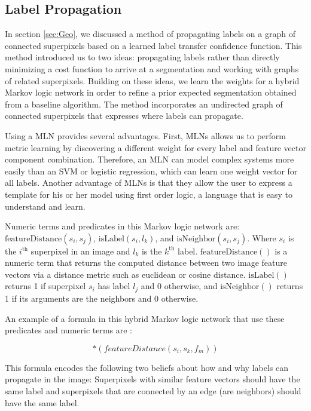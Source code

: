 \documentclass{article} %
\begin{document}
\subsection{Label Propagation}
\label{sec:AttemptLabProp}

	In section \ref{sec:Geo}, we discussed a method of propagating labels on a graph of connected superpixels based on a learned label transfer confidence function. This method introduced us to two ideas: propagating labels rather than directly minimizing a cost function to arrive at a segmentation and working with graphs of related superpixels. Building on these ideas, we learn the weights for a hybrid Markov logic network in order to refine a prior expected segmentation obtained from a baseline algorithm. The method incorporates an undirected graph of connected superpixels that expresses where labels can propagate.

	Using a MLN provides several advantages. First, MLNs allows us to perform metric learning by discovering a different weight for every label and feature vector component combination. Therefore, an MLN can model complex systems more easily than an SVM or logistic regression, which can learn one weight vector for all labels. Another advantage of MLNs is that they allow the user to express a template for his or her model using first order logic, a language that is easy to understand and learn.

Numeric terms and predicates in this Markov logic network are: $\mathrm{featureDistance}(s_i,s_j)$, $\mathrm{isLabel}(s_i,l_k)$, and $\mathrm{isNeighbor}(s_i,s_j)$.
Where $s_i$ is the $i^\textrm{th}$ superpixel in an image and $l_k$ is the $k^\textrm{th}$ label. 
$\mathrm{featureDistance}()$ is a numeric term that returns the computed distance between two image feature vectors via a distance metric such as euclidean or cosine distance. $\mathrm{isLabel}()$ returns 1 if superpixel $s_i$ has label $l_j$ and 0 otherwise, and $\mathrm{isNeighbor}()$ returns 1 if its arguments are the neighbors and 0 otherwise. 

An example of a formula in this hybrid Markov logic network that use these predicates and numeric terms are :

\begin{equation*}
	[isNeighbor(s_i,s_j) \Rightarrow (isLabel(s_i,l_k) \Leftrightarrow isLabel(s_k,l_m))]*(featureDistance(s_i, s_k, f_m))
\end{equation*}

This formula encodes the following two beliefs about how and why labels can propagate in the image:	Superpixels with similar feature vectors should have the same label and superpixels that are connected by an edge (are neighbors) should have the same label.
\end{document}
